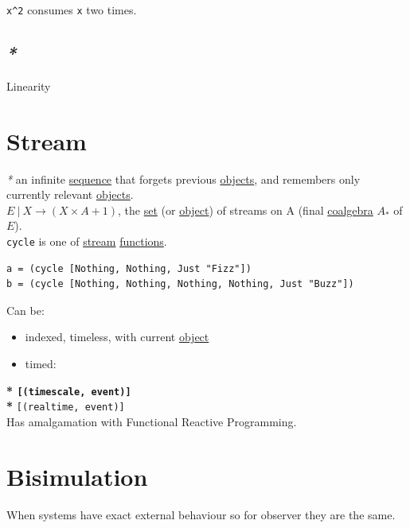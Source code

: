 \documentclass[a4paper,14pt,oneside]{book}
\begin{document}
\texttt{x\textasciicircum{}2} consumes \texttt{x} two times.\\

\section{\emph{*}}
\label{sec:org623ff02}

\label{org52fa9f2}Linearity\\

\chapter{\label{orgd13f55a}Stream}
\label{sec:org1956ea1}
\emph{*} an infinite \hyperref[org8265f32]{sequence} that forgets previous \hyperref[org67f2abd]{objects}, and remembers only currently relevant \hyperref[org67f2abd]{objects}.\\

\(E \ | \ X \to (X \times A + 1)\), the \hyperref[orgc6fbcf3]{set} (or \hyperref[org65d2cb0]{object}) of streams on A (final \hyperref[org6a67ed2]{coalgebra} \(A_{*}\) of \(E\)).\\

\texttt{cycle} is one of \hyperref[orgd13f55a]{stream} \hyperref[org788d18f]{functions}.\\
\begin{verbatim}
a = (cycle [Nothing, Nothing, Just "Fizz"])
b = (cycle [Nothing, Nothing, Nothing, Nothing, Just "Buzz"])
\end{verbatim}

Can be:\\
\begin{itemize}
\item indexed, timeless, with current \hyperref[org65d2cb0]{object}\\
\item timed:\\
\end{itemize}
\textbf{* \texttt{[(timescale, event)]}\\
*} \texttt{[(realtime, event)]}\\

Has amalgamation with Functional Reactive Programming.\\

\chapter{\label{orga1b63e5}Bisimulation}
\label{sec:org11cd26f}
When systems have exact external behaviour so for observer they are the same.\\
\end{document}
